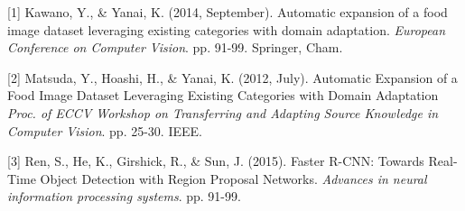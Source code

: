 \documentclass{article} %
\begin{document}
\small{

[1] Kawano, Y., \& Yanai, K. (2014, September). Automatic expansion of a
food image dataset leveraging existing categories with domain adaptation.
{\it European Conference on Computer Vision}. pp. 91-99. Springer, Cham.

[2] Matsuda, Y., Hoashi, H., \& Yanai, K. (2012, July). Automatic Expansion
of a Food Image Dataset Leveraging Existing Categories with Domain Adaptation
{\it Proc. of ECCV Workshop on Transferring and Adapting Source Knowledge in
Computer Vision}. pp. 25-30. IEEE.


[3] Ren, S., He, K., Girshick, R., \& Sun, J. (2015). Faster R-CNN: Towards
Real-Time Object Detection with Region Proposal Networks. {\it Advances in
neural information processing systems}. pp. 91-99.
}
\end{document}
